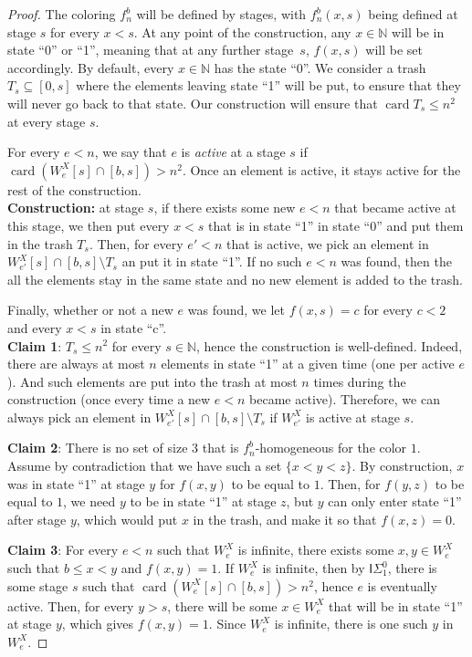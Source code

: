 \documentclass[10pt,a4paper]{amsart}
\newcommand{\ISig}{\mathsf{I}\Sigma^0}
\newcommand{\NN}[0]{\mathbb{N}}
\newcommand{\card}{\operatorname{card}}
\def\qt#1{``#1''}%
\begin{document}
\begin{proof}
The coloring $f_n^b$ will be defined by stages, with $f_n^b(x,s)$ being defined at stage $s$ for every $x < s$. At any point of the construction, any $x \in \NN$ will be in state \qt{0} or \qt{1}, meaning that at any further stage~$s$, $f(x, s)$ will be set accordingly. By default, every $x \in \NN$ has the state \qt{0}. We consider a trash $T_s \subseteq [0,s]$ where the elements leaving state \qt{1} will be put, to ensure that they will never go back to that state. Our construction will ensure that $\card T_s \leq n^2$ at every stage $s$.

For every $e < n$, we say that $e$ is \emph{active} at a stage $s$ if $\card (W^X_e[s] \cap [b,s]) > n^2$. Once an element is active, it stays active for the rest of the construction. \\

\textbf{Construction:} at stage $s$, if there exists some new $e < n$ that became active at this stage, we then put every $x < s$ that is in state \qt{1} in state \qt{0} and put them in the trash $T_s$. Then, for every $e' < n$ that is active, we pick an element in $W^X_{e'}[s] \cap [b,s] \setminus T_s$ an put it in state \qt{1}. If no such $e < n$ was found, then the all the elements stay in the same state and no new element is added to the trash.

Finally, whether or not a new $e$ was found, we let $f(x,s) = c$ for every $c < 2$ and every $x < s$ in state \qt{c}.   \\

\textbf{Claim 1}: $T_s \leq n^2$ for every $s \in \NN$, hence the construction is well-defined. Indeed, there are always at most $n$ elements in state \qt{1} at a given time (one per active $e$). And such elements are put into the trash at most $n$ times during the construction (once every time a new $e <n$ became active). Therefore, we can always pick an element in $W^X_{e'}[s] \cap [b,s] \setminus T_s$ if $W^X_{e'}$ is active at stage $s$.
\smallskip

\textbf{Claim 2}: There is no set of size $3$ that is $f_n^b$-homogeneous for the color $1$. Assume by contradiction that we have such a set $\{x < y < z\}$. By construction, $x$ was in state \qt{1} at stage $y$ for $f(x,y)$ to be equal to $1$. Then, for $f(y,z)$ to be equal to $1$, we need $y$ to be in state \qt{1} at stage $z$, but $y$ can only enter state \qt{1} after stage $y$, which would put $x$ in the trash, and make it so that $f(x,z) = 0$.
\smallskip

\textbf{Claim 3}: For every $e < n$ such that $W^X_e$ is infinite, there exists some $x,y \in W^X_e$ such that $b \leq x < y$ and $f(x,y) = 1$.
If $W^X_e$ is infinite, then by $\ISig_1$, there is some stage $s$ such that $\card(W^X_e[s] \cap [b,s]) > n^2$, hence $e$ is eventually active. Then, for every $y > s$, there will be some $x \in W^X_e$ that will be in state \qt{1} at stage $y$, which gives $f(x,y) = 1$. Since $W^X_e$ is infinite, there is one such $y$ in $W^X_e$.

\end{proof}
\end{document}
